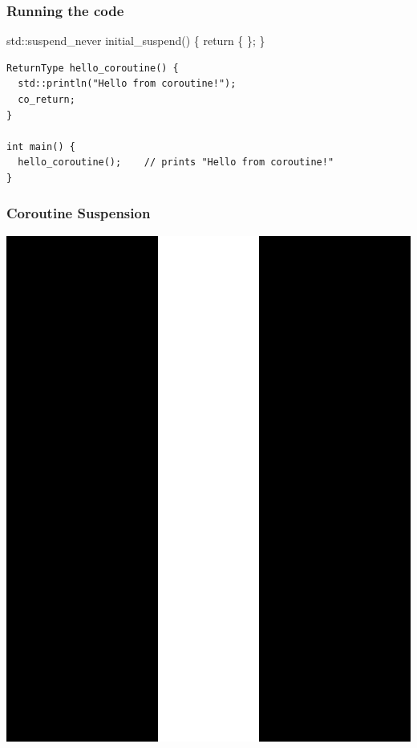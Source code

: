 \documentclass[aspectratio=169]{beamer}
\begin{document}
\begin{frame}[fragile]

  \frametitle{Running the code}

  \begin{semiverbatim}
\alert<1>{std::suspend_never}  initial_suspend() \{ return \{ \}; \}
  \end{semiverbatim}

  \begin{lstlisting}[style=cpp20]
ReturnType hello_coroutine() {
  std::println("Hello from coroutine!");
  co_return;
}

int main() {
  hello_coroutine();    // prints "Hello from coroutine!"
}
\end{lstlisting}


\end{frame}

\begin{frame}

  \frametitle{Coroutine Suspension}
  
  \begin{center}
  \includegraphics[height=.75\textheight]{corogfx/icon_pause.png}
  \end{center}

\end{frame}
\end{document}
